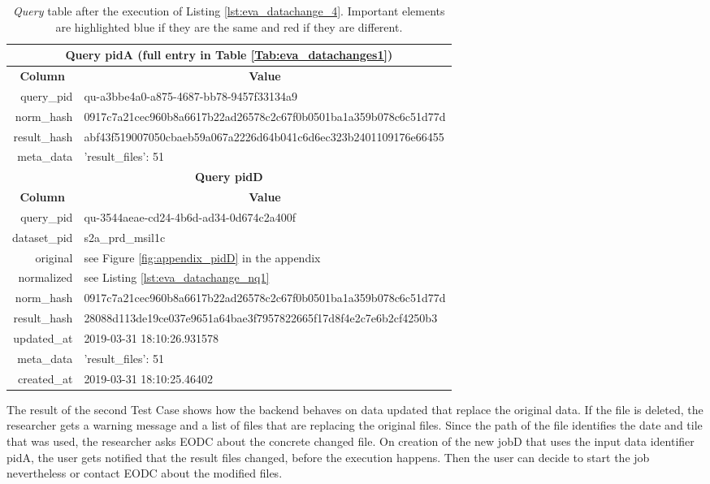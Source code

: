 \documentclass[draft,final]{vutinfth} %
\begin{document}
\begin{enumerate}
	\begin{table}[]
		\caption{\textit{Query} table after the execution of Listing \ref{lst:eva_datachange_4}. Important elements are highlighted blue if they are the same and red if they are different.}
		\centering
		\begin{tabular}{|r|l|}
			\hline \multicolumn{2}{|c|}{\textbf{Query pidA (full entry in Table \ref{Tab:eva_datachanges1})}} \\
			\hline \multicolumn{1}{|c|}{\textbf{Column}}  &  \multicolumn{1}{c|}{\textbf{Value}} \\ \hline
			query\_pid & {\color{red}qu-a3bbe4a0-a875-4687-bb78-9457f33134a9}  \\ 
			norm\_hash & {\color{blue}0917c7a21cec960b8a6617b22ad26578c2c67f0b0501ba1a359b078c6c51d77d}  \\
			result\_hash & {\color{red}abf43f519007050cbaeb59a067a2226d64b041c6d6ec323b2401109176e66455}   \\
			meta\_data & {'result\_files': 51}  \\
			\hline \multicolumn{2}{|c|}{\textbf{Query pidD}} \\
			\hline \multicolumn{1}{|c|}{\textbf{Column}}  &  \multicolumn{1}{c|}{\textbf{Value}} \\ \hline
			query\_pid & { \color{red} qu-3544aeae-cd24-4b6d-ad34-0d674c2a400f}  \\ 
			dataset\_pid & s2a\_prd\_msil1c  \\ 
			original & see Figure \ref{fig:appendix_pidD} in the appendix \\
			normalized & see Listing \ref{lst:eva_datachange_nq1}  \\
			norm\_hash & {\color{blue}0917c7a21cec960b8a6617b22ad26578c2c67f0b0501ba1a359b078c6c51d77d}  \\
			result\_hash & {\color{red}28088d113de19ce037e9651a64bae3f7957822665f17d8f4e2c7e6b2cf4250b3}  \\
			updated\_at & 2019-03-31 18:10:26.931578   \\
			meta\_data & {'result\_files': 51}  \\
			created\_at & 2019-03-31 18:10:25.46402   \\ \hline
		\end{tabular}
		\label{Tab:eva_datachanges5}
	\end{table}
\end{enumerate}

The result of the second Test Case shows how the backend behaves on data updated that replace the original data. If the file is deleted, the researcher gets a warning message and a list of files that are replacing the original files. Since the path of the file identifies the date and tile that was used, the researcher asks EODC about the concrete changed file. On creation of the new jobD that uses the input data identifier pidA, the user gets notified that the result files changed, before the execution happens. Then the user can decide to start the job nevertheless or contact EODC about the modified files.
\end{document}

